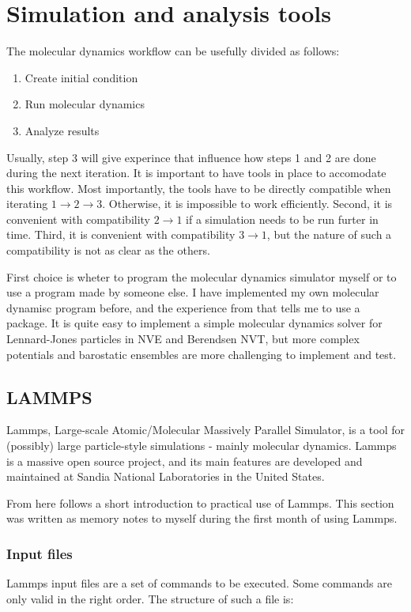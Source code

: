 \chapter{Simulation and analysis tools}
The molecular dynamics workflow can be usefully divided as follows: 
\begin{enumerate}
\item Create initial condition
\item Run molecular dynamics
\item Analyze results
\end{enumerate}
Usually, step 3 will give experince that influence how steps 1 and 2 are done during the next iteration. It is important to have tools in place to accomodate this workflow. Most importantly, the tools have to be directly compatible when iterating $1 \to 2\to 3$. Otherwise, it is impossible to work efficiently. Second, it is convenient with compatibility $2\to 1$ if a simulation needs to be run furter in time. Third, it is convenient with compatibility $3 \to 1$, but the nature of such a compatibility is not as clear as the others. 



First choice is wheter to program the molecular dynamics simulator myself or to use a program made by someone else. I have implemented my own molecular dynamisc program before, and the experience from that tells me to use a package. It is quite easy to implement a simple molecular dynamics solver for Lennard-Jones particles in NVE and Berendsen NVT, but more complex potentials and barostatic ensembles are more challenging to implement and test. 

\section{LAMMPS}
Lammps, Large-scale Atomic/Molecular Massively Parallel Simulator, is a tool for (possibly) large particle-style simulations - mainly molecular dynamics. Lammps is a massive open source project, and its main features are developed and maintained at Sandia National Laboratories in the United States. 

From here follows a short introduction to practical use of Lammps. This section was written as memory notes to myself during the first month of using Lammps. 

\subsection{Input files}
Lammps input files are a set of commands to be executed. Some commands are only valid in the right order. The structure of such a file is:


